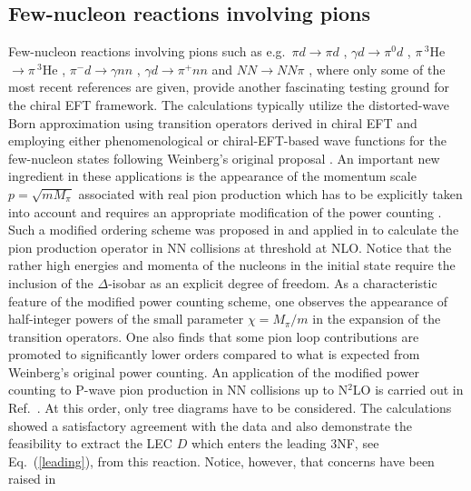 \documentclass[aps,rmp,nofootinbib,twocolumn,floatfix]{revtex4}
\begin{document}

\subsection{Few-nucleon reactions involving pions}
\label{sec:further_scales}

Few-nucleon reactions involving pions such as e.g.~$\pi d \to \pi d$ \cite{Beane:2002wk}, 
$\gamma d \to \pi^0 d$ \cite{Beane:1997iv,Krebs:2004ir}, $\pi \, ^3$He${} \to
\pi \, ^3$He \cite{Baru:2002cg}, $\pi^- d \to \gamma nn$ \cite{Gardestig:2005pp}, 
$\gamma d \to \pi^+ nn$ \cite{Lensky:2007zc} and $NN \to NN \pi$
\cite{Baru:2007cd}, where only some of the most 
recent references are given, provide another fascinating testing ground for the
chiral EFT framework. The calculations typically utilize the distorted-wave Born
approximation using transition operators derived in chiral EFT and employing
either phenomenological or chiral-EFT-based wave functions for the
few-nucleon states following Weinberg's original proposal
\cite{Weinberg:1992yk}.  
An important new ingredient in these applications is the appearance of the momentum
scale $p = \sqrt{m M_\pi}$ associated with real pion production which has
to be explicitly taken into account and requires an appropriate modification
of the power counting
\cite{Cohen:1995cc,Bernard:1998sz,daRocha:1999dm}. Such a modified
ordering scheme was proposed in \cite{Hanhart:2000gp} and applied in
\cite{Hanhart:2002bu} to calculate the pion production
operator in NN collisions at threshold at NLO.  Notice that the rather high
energies and momenta of the nucleons in the initial state require the
inclusion of the $\Delta$-isobar as an explicit degree of freedom. As a
characteristic feature of
the modified power counting scheme, one observes the appearance of 
half-integer powers of the small parameter $\chi = M_\pi/m$ in the 
expansion of the transition operators. One also finds that some pion loop
contributions are promoted to significantly lower orders compared to what is
expected from Weinberg's original power counting. An application of the modified power
counting to P-wave pion production in NN collisions up to N$^2$LO is carried
out in Ref.~\cite{Hanhart:2000gp}. At this order, only tree diagrams have to be
considered. The calculations showed
a satisfactory agreement with the data and also demonstrate the feasibility to
extract the LEC $D$ which enters the leading 3NF, see Eq.~(\ref{leading}),
from this reaction. Notice, however, that concerns have been raised in 
\end{document}
